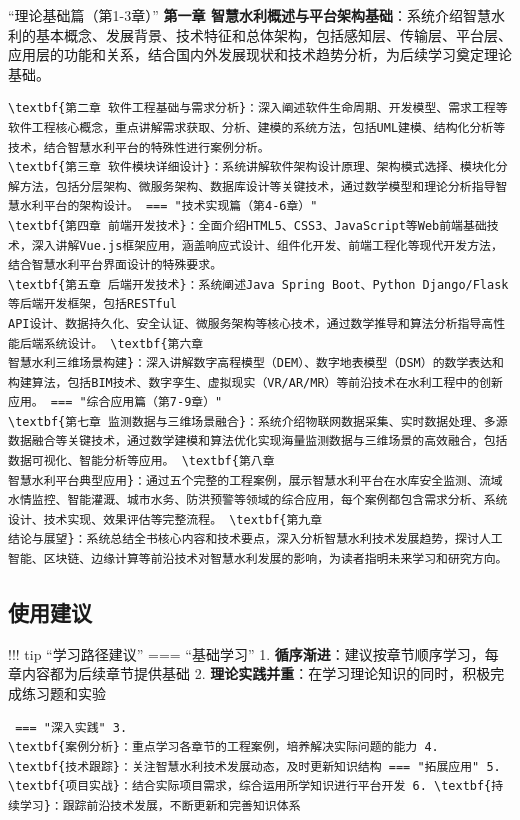 ``理论基础篇（第1-3章）'' \textbf{第一章
智慧水利概述与平台架构基础}：系统介绍智慧水利的基本概念、发展背景、技术特征和总体架构，包括感知层、传输层、平台层、应用层的功能和关系，结合国内外发展现状和技术趋势分析，为后续学习奠定理论基础。 \begin{verbatim}
\textbf{第二章 软件工程基础与需求分析}：深入阐述软件生命周期、开发模型、需求工程等软件工程核心概念，重点讲解需求获取、分析、建模的系统方法，包括UML建模、结构化分析等技术，结合智慧水利平台的特殊性进行案例分析。
\textbf{第三章 软件模块详细设计}：系统讲解软件架构设计原理、架构模式选择、模块化分解方法，包括分层架构、微服务架构、数据库设计等关键技术，通过数学模型和理论分析指导智慧水利平台的架构设计。 === "技术实现篇（第4-6章）"
\textbf{第四章 前端开发技术}：全面介绍HTML5、CSS3、JavaScript等Web前端基础技术，深入讲解Vue.js框架应用，涵盖响应式设计、组件化开发、前端工程化等现代开发方法，结合智慧水利平台界面设计的特殊要求。
\textbf{第五章 后端开发技术}：系统阐述Java Spring Boot、Python Django/Flask等后端开发框架，包括RESTful
API设计、数据持久化、安全认证、微服务架构等核心技术，通过数学推导和算法分析指导高性能后端系统设计。 \textbf{第六章
智慧水利三维场景构建}：深入讲解数字高程模型（DEM）、数字地表模型（DSM）的数学表达和构建算法，包括BIM技术、数字孪生、虚拟现实（VR/AR/MR）等前沿技术在水利工程中的创新应用。 === "综合应用篇（第7-9章）"
\textbf{第七章 监测数据与三维场景融合}：系统介绍物联网数据采集、实时数据处理、多源数据融合等关键技术，通过数学建模和算法优化实现海量监测数据与三维场景的高效融合，包括数据可视化、智能分析等应用。 \textbf{第八章
智慧水利平台典型应用}：通过五个完整的工程案例，展示智慧水利平台在水库安全监测、流域水情监控、智能灌溉、城市水务、防洪预警等领域的综合应用，每个案例都包含需求分析、系统设计、技术实现、效果评估等完整流程。 \textbf{第九章
结论与展望}：系统总结全书核心内容和技术要点，深入分析智慧水利技术发展趋势，探讨人工智能、区块链、边缘计算等前沿技术对智慧水利发展的影响，为读者指明未来学习和研究方向。 \end{verbatim}
\subsection{使用建议}\label{ux4f7fux7528ux5efaux8bae} !!! tip ``学习路径建议'' === ``基础学习'' 1.
\textbf{循序渐进}：建议按章节顺序学习，每章内容都为后续章节提供基础 2. \textbf{理论实践并重}：在学习理论知识的同时，积极完成练习题和实验 \begin{verbatim} === "深入实践" 3.
\textbf{案例分析}：重点学习各章节的工程案例，培养解决实际问题的能力 4. \textbf{技术跟踪}：关注智慧水利技术发展动态，及时更新知识结构 === "拓展应用" 5.
\textbf{项目实战}：结合实际项目需求，综合运用所学知识进行平台开发 6. \textbf{持续学习}：跟踪前沿技术发展，不断更新和完善知识体系 \end{verbatim}
